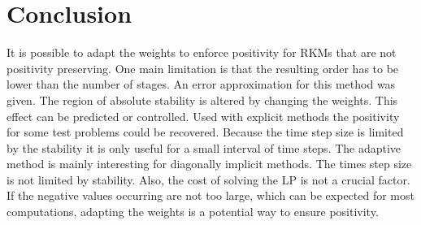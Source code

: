 \documentclass[a4paper]{article}
\numberwithin{equation}{section}
\theoremstyle{plain}
\theoremstyle{definition}
\numberwithin{theorem}{section}
\newcommand{\1}{\mathbbm{1}}
\begin{document}
\section{Conclusion} \label{sec:conclusion}
It is possible to adapt the weights to enforce positivity for RKMs that are not positivity preserving. 
One main limitation is that the resulting order has to be lower than the number of stages.
An error approximation for this method was given.  
The region of absolute stability is altered by changing the weights. This effect can be predicted or controlled. 
Used with explicit methods the positivity for some test problems could be recovered.  
Because the time step size is limited by the stability it is only useful for a small interval of time steps. 
The adaptive method is mainly interesting for diagonally implicit methods.
The times step size is not limited by stability. 
Also, the cost of solving the LP is not a crucial factor.  
If the negative values occurring are not too large, which can be expected for most computations, adapting the weights is a potential way to ensure positivity. 



\printbibliography
\end{document}
